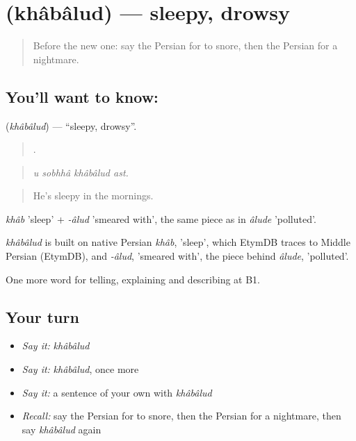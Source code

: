 \section[\texorpdfstring{\fa{خوابالود} (khâbâlud)}{خوابالود (khâbâlud)}]{ (khâbâlud) — sleepy, drowsy}

\label{lesson:FA-C499-khabalud}



\begin{quote}
Before the new one: say the Persian for to snore, then the Persian for a nightmare.
\end{quote}

\subsection*{You'll want to know: }
\textbf{} (\emph{khâbâlud}) — \textquotedblleft{}sleepy, drowsy\textquotedblright{}.

\begin{quote}
   .
\end{quote}

\begin{quote}
\emph{u sobhhâ khâbâlud ast.}
\end{quote}

\begin{quote}
He's sleepy in the mornings.
\end{quote}

\emph{khâb} 'sleep' + \emph{-âlud} 'smeared with', the same piece as in \emph{âlude} 'polluted'.

\begin{cousinweb}
\emph{khâbâlud} is built on native Persian \emph{khâb}, 'sleep', which EtymDB traces to Middle Persian (EtymDB), and \emph{-âlud}, 'smeared with', the piece behind \emph{âlude}, 'polluted'.
\end{cousinweb}

\begin{grammarlens}[title={What you've built}]
One more word for telling, explaining and describing at B1.
\end{grammarlens}

\subsection*{Your turn}
\begin{itemize}
\raggedright
  \item \emph{Say it:} \emph{khâbâlud}
  \item \emph{Say it:} \emph{khâbâlud}, once more
  \item \emph{Say it:} a sentence of your own with \emph{khâbâlud}
  \item \emph{Recall:} say the Persian for to snore, then the Persian for a nightmare, then say \emph{khâbâlud} again
\end{itemize}

